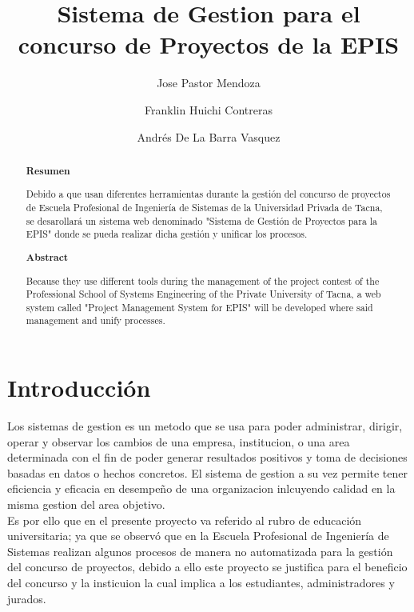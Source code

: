 \documentclass[%
 reprint,
 amsmath,amssymb,
 aps,
]{revtex4-1}
\begin{document}
\title{Sistema de Gestion para el concurso de Proyectos de la EPIS}
\author{Jose Pastor Mendoza}
\author{Franklin Huichi Contreras}
\author{Andrés De La Barra Vasquez}
%

\begin{abstract}
\begin{center}
\textbf{Resumen}
\end{center}
Debido a que usan diferentes herramientas durante la gestión del concurso de proyectos de Escuela Profesional de Ingeniería de Sistemas de la Universidad Privada de Tacna, se desarollará un sistema web denominado "Sistema de Gestión de Proyectos para la EPIS" donde se pueda realizar dicha gestión y unificar los procesos.


\begin{center}
\textbf{Abstract}
\end{center}
Because they use different tools during the management of the project contest of the Professional School of Systems Engineering of the Private University of Tacna, a web system called "Project Management System for EPIS" will be developed where said management and unify processes.

\end{abstract}



\maketitle


\section {Introducción}

Los sistemas de gestion es un metodo que se usa para poder administrar, dirigir, operar y observar los cambios de una empresa, institucion, o una area determinada con el fin de poder generar resultados positivos y toma de decisiones basadas en datos o hechos concretos. El sistema de gestion a su vez permite tener eficiencia y eficacia en desempeño de una organizacion inlcuyendo calidad en la misma gestion del area objetivo.\\
Es por ello que en el presente proyecto va referido al rubro de educación universitaria; ya que se observó que en la Escuela Profesional de Ingeniería de Sistemas realizan algunos procesos de manera no automatizada para la gestión del concurso de proyectos, debido a ello este proyecto se justifica para el beneficio del concurso y la insticuion la cual implica a los estudiantes, administradores y jurados.
\end{document}
